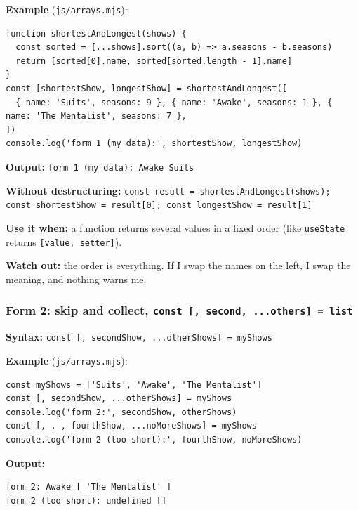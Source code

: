 \documentclass[
  10pt,
]{article}
\newcommand{\passthrough}[1]{#1}
\begin{document}
\textbf{Example} (\passthrough{\lstinline!js/arrays.mjs!}):

\begin{lstlisting}
function shortestAndLongest(shows) {
  const sorted = [...shows].sort((a, b) => a.seasons - b.seasons)
  return [sorted[0].name, sorted[sorted.length - 1].name]
}
const [shortestShow, longestShow] = shortestAndLongest([
  { name: 'Suits', seasons: 9 }, { name: 'Awake', seasons: 1 }, { name: 'The Mentalist', seasons: 7 },
])
console.log('form 1 (my data):', shortestShow, longestShow)
\end{lstlisting}

\textbf{Output:} \passthrough{\lstinline!form 1 (my data): Awake Suits!}

\textbf{Without destructuring:}
\passthrough{\lstinline!const result = shortestAndLongest(shows); const shortestShow = result[0]; const longestShow = result[1]!}

\textbf{Use it when:} a function returns several values in a fixed order
(like \passthrough{\lstinline!useState!} returns
\passthrough{\lstinline![value, setter]!}).

\textbf{Watch out:} the order is everything. If I swap the names on the
left, I swap the meaning, and nothing warns me.

\hypertarget{form-2-skip-and-collect-const-second-...others-list}{%
\subsubsection{\texorpdfstring{Form 2: skip and collect,
\texttt{const\ {[},\ second,\ ...others{]}\ =\ list}}{Form 2: skip and collect, const {[}, second, ...others{]} = list}}\label{form-2-skip-and-collect-const-second-...others-list}}

\textbf{Syntax:}
\passthrough{\lstinline!const [, secondShow, ...otherShows] = myShows!}

\textbf{Example} (\passthrough{\lstinline!js/arrays.mjs!}):

\begin{lstlisting}
const myShows = ['Suits', 'Awake', 'The Mentalist']
const [, secondShow, ...otherShows] = myShows
console.log('form 2:', secondShow, otherShows)
const [, , , fourthShow, ...noMoreShows] = myShows
console.log('form 2 (too short):', fourthShow, noMoreShows)
\end{lstlisting}

\textbf{Output:}

\begin{lstlisting}
form 2: Awake [ 'The Mentalist' ]
form 2 (too short): undefined []
\end{lstlisting}
\end{document}
